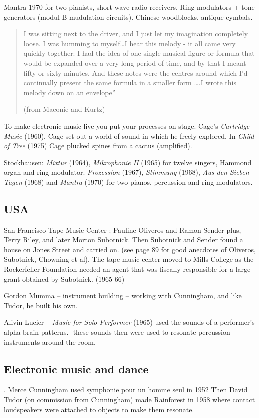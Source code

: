 Mantra 1970 for two pianists, short-wave radio receivers, Ring modulators + tone generators (modul B mudulation circuits). Chinese woodblocks, antique cymbals.

\begin{quotation}I was sitting next to the driver, and I just let my imagination completely loose. I was humming to myself…I hear this melody - it all came very quickly together: I had the idea of one single musical figure or formula that would be expanded over a very long period of time, and by that I meant fifty or sixty minutes. And these notes were the centres around which I'd continually present the same formula in a smaller form ….I wrote this melody down on an envelope''

(from Maconie and Kurtz)
\end{quotation}

To make electronic music live you put your processes on stage. Cage's \textit{Cartridge Music} (1960).
Cage set out a world of sound in which he freely explored.  In \textit{Child of Tree} (1975) Cage plucked spines from a cactus (amplified). 

Stockhausen: \textit{Mixtur} (1964), \textit{Mikrophonie II} (1965) for twelve singers, Hammond organ and ring modulator. \textit{Prozession} (1967), \textit{Stimmung} (1968), \textit{Aus den Sieben Tagen} (1968) and \textit{Mantra} (1970) for two pianos, percussion and ring modulators.

\subsection{USA}
San Francisco Tape Music Center : Pauline Oliveros and Ramon Sender plus, Terry Riley, and later Morton Subotnick.   Then Subotnick and Sender found a house on Jones Street and carried on. (see page 89 for good anecdotes of Oliveros, Subotnick, Chowning et al).
The tape music center moved to Mills College as the Rockerfeller Foundation needed an agent that was fiscally responsible for a large grant obtained by Subotnick. (1965-66)

Gordon Mumma – instrument building – working with Cunningham, and like Tudor, he built his own.

Alivin Lucier – \textit{Music for Solo Performer} (1965) used the sounds of a performer's alpha brain patterns.- these sounds then were used to resonate percussion instruments around the room.

\subsection{Electronic music and dance}.
Merce Cunningham used symphonie pour un homme seul in 1952  Then David Tudor (on commission from Cunningham) made Rainforest in 1958 where contact loudspeakers were attached to objects to make them resonate.    

